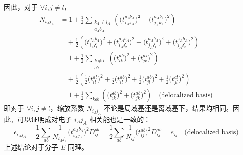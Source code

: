 因此，对于 $\forall i, j \neq l$，
\begin{align*}
  N_{i_A j_A} &= 1 + \frac{1}{2} \sum_{\substack{k_A \neq l_A \\ a_A b_A}} \left( \big( t_{i_A k_A}^{a_A b_A} \big)^2 + \big( t_{j_A k_A}^{a_A b_A} \big)^2 \right) \\
  &\quad + \frac{1}{2} \left( \big( t_{i_A \mathscr{l}_1}^{a_A b_A} \big)^2 + \big( t_{i_A \mathscr{l}_2}^{a_A b_A} \big)^2 + \big( t_{j_A \mathscr{l}_1}^{a_A b_A} \big)^2 + \big( t_{j_A \mathscr{l}_2}^{a_A b_A} \big)^2 \right) \\
  &= 1 + \frac{1}{2} \sum_{\substack{k \neq l \\ ab}} \left( \big( t_{ik}^{ab} \big)^2 + \big( t_{jk}^{ab} \big)^2 \right) \\
  &\quad + \frac{1}{2} \left( \frac{1}{2} \big( t_{il}^{ab} \big)^2 + \frac{1}{2} \big( t_{il}^{ab} \big)^2 + \frac{1}{2} \big( t_{jl}^{ab} \big)^2 + \frac{1}{2} \big( t_{jl}^{ab} \big)^2 \right) \\
  &= 1 + \frac{1}{2} \sum_{kab} \left( \big( t_{ik}^{ab} \big)^2 + \big( t_{jk}^{ab} \big)^2 \right) \quad \text{(delocalized basis)}
\end{align*}
即对于 $\forall i, j \neq l$，缩放系数 $N_{i_A j_A}$ 不论是局域基还是离域基下，结果均相同。因此，可以证明成对电子 $i_A j_A$ 相关能也是一致的：
\begin{equation*}
  e_{i_A j_A} = \frac{1}{2} \sum_{ab} \frac{1}{N_{i_A j_A}} \big( t_{i_A j_A}^{a_A b_A} \big)^2 D_{ij}^{ab} = \frac{1}{2} \sum_{ab} \frac{1}{N_{ij}} \big( t_{ij}^{ab} \big)^2 D_{ij}^{ab} = e_{ij} \quad \text{(delocalized basis)}
\end{equation*}
上述结论对于分子 $B$ 同理。


